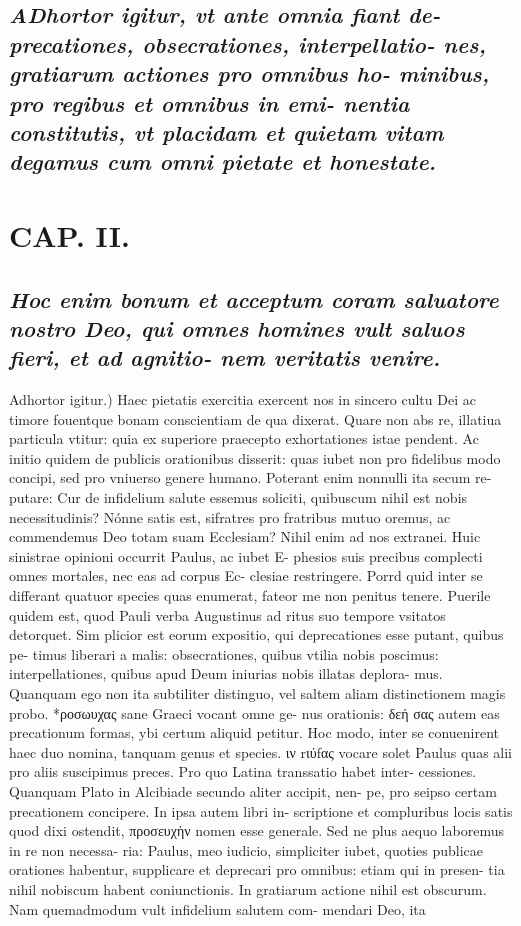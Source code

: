 \documentclass{article}
\begin{document}
\begin{pages}
\subsection*{\textit{\huge\textbf{A}\normalsize Dhortor igitur, vt ante omnia fiant de- precationes, obsecrationes, interpellatio- nes, gratiarum actiones pro omnibus ho- minibus, pro regibus et omnibus in emi- nentia constitutis, vt placidam et quietam vitam degamus cum omni pietate et honestate. }}
\section*{CAP. II. }
\marginpar{[ p.17 ]}
{}
\subsection*{\textit{ Hoc enim bonum et acceptum coram saluatore nostro Deo, qui omnes homines vult saluos fieri, et ad agnitio- nem veritatis venire. }}\pstart Adhortor igitur.) Haec pietatis exercitia exercent nos in sincero cultu Dei ac timore fouentque bonam conscientiam de qua dixerat. Quare non abs re, illatiua particula vtitur: quia ex superiore praecepto exhortationes istae pendent. Ac initio quidem de publicis orationibus disserit: quas iubet non pro fidelibus modo concipi, sed pro vniuerso genere humano. Poterant enim nonnulli ita secum re- putare: Cur de infidelium salute essemus soliciti, quibuscum nihil est nobis necessitudinis? Nónne satis est, sifratres pro fratribus mutuo oremus, ac commendemus Deo totam suam Ecclesiam? Nihil enim ad nos extranei. Huic sinistrae opinioni occurrit Paulus, ac iubet E- phesios suis precibus complecti omnes mortales, nec eas ad corpus Ec- clesiae restringere. Porrd quid inter se differant quatuor species quas enumerat, fateor me non penitus tenere. Puerile quidem est, quod Pauli verba Augustinus ad ritus suo tempore vsitatos detorquet. Sim plicior est eorum expositio, qui deprecationes esse putant, quibus pe- timus liberari a malis: obsecrationes, quibus vtilia nobis poscimus: interpellationes, quibus apud Deum iniurias nobis illatas deplora- mus. Quanquam ego non ita subtiliter distinguo, vel saltem aliam distinctionem magis probo. *ροσωυχας sane Graeci vocant omne ge- nus orationis: δεή σας autem eas precationum formas, ybi certum aliquid petitur. Hoc modo, inter se conuenirent haec duo nomina, tanquam genus et species. ιν rιύfας vocare solet Paulus quas alii pro aliis suscipimus preces. Pro quo Latina transsatio habet inter- cessiones. Quanquam Plato in Alcibiade secundo aliter accipit, nen- pe, pro seipso certam precationem concipere. In ipsa autem libri in- scriptione et compluribus locis satis quod dixi ostendit, προσευχὴν nomen esse generale. Sed ne plus aequo laboremus in re non necessa- ria: Paulus, meo iudicio, simpliciter iubet, quoties publicae orationes habentur, supplicare et deprecari pro omnibus: etiam qui in presen- tia nihil nobiscum habent coniunctionis. In gratiarum actione nihil est obscurum. Nam quemadmodum vult infidelium salutem com- mendari Deo, ita 
\end{pages}
\end{document}
